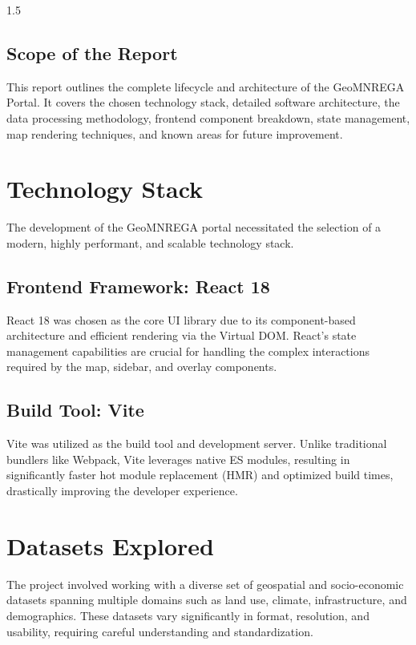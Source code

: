 \documentclass[12pt,a4paper]{report}
\begin{document}
\begin{spacing}{1.5}
\section{Scope of the Report}
This report outlines the complete lifecycle and architecture of the GeoMNREGA Portal. It covers the chosen technology stack, detailed software architecture, the data processing methodology, frontend component breakdown, state management, map rendering techniques, and known areas for future improvement.

\chapter{Technology Stack}

The development of the GeoMNREGA portal necessitated the selection of a modern, highly performant, and scalable technology stack.

\section{Frontend Framework: React 18}
React 18 was chosen as the core UI library due to its component-based architecture and efficient rendering via the Virtual DOM. React's state management capabilities are crucial for handling the complex interactions required by the map, sidebar, and overlay components.

\section{Build Tool: Vite}
Vite was utilized as the build tool and development server. Unlike traditional bundlers like Webpack, Vite leverages native ES modules, resulting in significantly faster hot module replacement (HMR) and optimized build times, drastically improving the developer experience.

\chapter{Datasets Explored}

The project involved working with a diverse set of geospatial and socio-economic datasets spanning multiple domains such as land use, climate, infrastructure, and demographics. These datasets vary significantly in format, resolution, and usability, requiring careful understanding and standardization.


\end{spacing}
\end{document}

